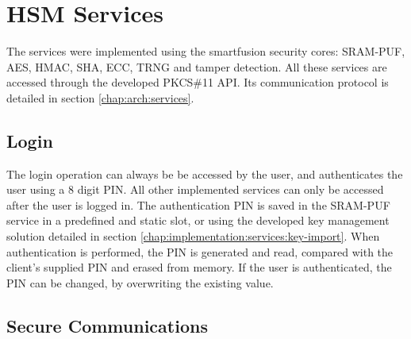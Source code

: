 \section{HSM Services}\label{chap:implementation:services}

The services were implemented using the smartfusion security cores: SRAM-PUF, AES, HMAC, SHA, ECC, TRNG and tamper detection.
All these services are accessed through the developed PKCS\#11 API. Its communication protocol is detailed in section \ref{chap:arch:services}.

\subsection{Login}\label{chap:implementation:services:authentication}

The login operation can always be be accessed by the user, and authenticates the user using a 8 digit PIN. All other implemented services can only be accessed after the user is logged in.
The authentication PIN is saved in the SRAM-PUF service in a predefined and static slot, or using the developed key management solution detailed in section \ref{chap:implementation:services:key-import}. When authentication is performed, the PIN is generated and read, compared with the client's supplied PIN and erased from memory.
If the user is authenticated, the PIN can be changed, by overwriting the existing value.

\subsection{Secure Communications}\label{chap:implementation:services:secure}

